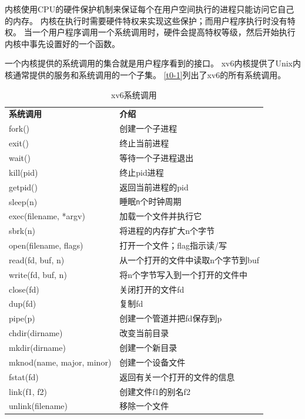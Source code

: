 内核使用CPU的硬件保护机制来保证每个在用户空间执行的进程只能访问它自己的内存。
内核在执行时需要硬件特权来实现这些保护；而用户程序执行时没有特权。
当一个用户程序调用一个系统调用时，硬件会提高特权等级，然后开始执行内核中事先设置好的一个函数。

一个内核提供的系统调用的集合就是用户程序看到的接口。
xv6内核提供了Unix内核通常提供的服务和系统调用的一个子集。
\autoref{t0-1}列出了xv6的所有系统调用。

\begin{table}[htbp]
    \centering
    \begin{tabular}{ll}
        \textbf{系统调用}   & \textbf{介绍} \\
        fork()  & 创建一个子进程    \\
        exit()  & 终止当前进程      \\
        wait()  & 等待一个子进程退出 \\
        kill(pid)   & 终止pid进程   \\
        getpid()    & 返回当前进程的pid         \\
        sleep(n)    & 睡眠\texttt{n}个时钟周期  \\
        exec(filename, *argv)   & 加载一个文件并执行它  \\
        sbrk(n) & 将进程的内存扩大n个字节   \\
        open(filename, flags)   & 打开一个文件；flag指示读/写 \\
        read(fd, buf, n)    & 从一个打开的文件中读取n个字节到buf \\
        write(fd, buf, n)   & 将n个字节写入到一个打开的文件中 \\
        close(fd)   & 关闭打开的文件fd  \\
        dup(fd)     & 复制fd    \\
        pipe(p)     & 创建一个管道并把fd保存到p \\
        chdir(dirname)  & 改变当前目录  \\
        mkdir(dirname)  & 创建一个新目录    \\
        mknod(name, major, minor)   & 创建一个设备文件  \\
        fstat(fd)       & 返回有关一个打开的文件的信息  \\
        link(f1, f2)    & 创建文件f1的别名f2    \\
        unlink(filename)& 移除一个文件  \\
    \end{tabular}
    \caption{xv6系统调用}
    \label{t0-1}
\end{table}

